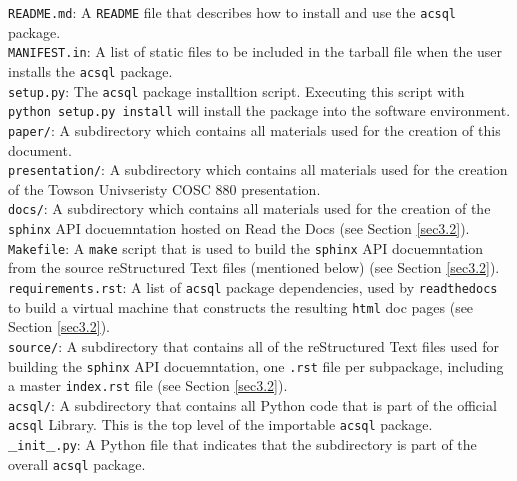\documentclass[10pt,journal,compsoc]{IEEEtran}
\begin{document}
\noindent\texttt{README.md}: A \texttt{README} file that describes how to install and use the \texttt{acsql} package.\\

\noindent\texttt{MANIFEST.in}: A list of static files to be included in the tarball file when the user installs the \texttt{acsql} package.\\

\noindent\texttt{setup.py}: The \texttt{acsql} package installtion script.  Executing this script with \texttt{python setup.py install} will install the package into the software environment.\\

\noindent\texttt{paper/}: A subdirectory which contains all materials used for the creation of this document.\\

\noindent\texttt{presentation/}: A subdirectory which contains all materials used for the creation of the Towson Univseristy COSC 880 presentation.\\

\noindent\texttt{docs/}: A subdirectory which contains all materials used for the creation of the \texttt{sphinx} API docuemntation hosted on Read the Docs (see Section \ref{sec3.2}).\\

\noindent\texttt{Makefile}: A \texttt{make} script that is used to build the \texttt{sphinx} API docuemntation from the source reStructured Text files (mentioned below) (see Section \ref{sec3.2}).\\

\noindent\texttt{requirements.rst}: A list of \texttt{acsql} package dependencies, used by \texttt{readthedocs} to build a virtual machine that constructs the resulting \texttt{html} doc pages
(see Section \ref{sec3.2}).\\

\noindent\texttt{source/}: A subdirectory that contains all of the reStructured Text files used for building the \texttt{sphinx} API docuemntation, one \texttt{.rst} file per subpackage, including
a master \texttt{index.rst} file (see Section \ref{sec3.2}).\\

\noindent\texttt{acsql/}: A subdirectory that contains all Python code that is part of the official \texttt{acsql} Library. This is the top level of the importable \texttt{acsql} package.\\

\noindent\texttt{$\_$$\_$init$\_$$\_$.py}: A Python file that indicates that the subdirectory is part of the overall \texttt{acsql} package.\\
\end{document}
